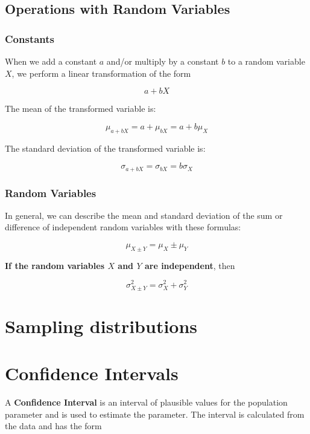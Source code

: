 \documentclass[
]{book}
\begin{document}
\hypertarget{operations-with-random-variables}{%
\section{Operations with Random Variables}\label{operations-with-random-variables}}

\hypertarget{constants}{%
\subsection{Constants}\label{constants}}

When we add a constant \(a\) and/or multiply by a constant \(b\) to a random
variable \(X\), we perform a linear transformation of the form

\[
a + bX
\]

The mean of the transformed variable is:

\[
\mu_{a+bX}=a+\mu_{bX}=a+b\mu_X
\]

The standard deviation of the transformed variable is:

\[
\sigma_{a+bX}=\sigma_{bX}=b\sigma_X
\]

\hypertarget{random-variables-1}{%
\subsection{Random Variables}\label{random-variables-1}}

In general, we can describe the mean and standard deviation of the sum
or difference of independent random variables with these formulas:

\[\mu_{X \pm Y} = \mu_X \pm \mu_Y\]

\textbf{If the random variables \(X\) and \(Y\) are independent}, then

\[ \sigma_{X \pm Y}^2 = \sigma_X^2 + \sigma_Y^2 \]

\hypertarget{sampling-distributions}{%
\chapter{Sampling distributions}\label{sampling-distributions}}

\hypertarget{confidence-intervals}{%
\chapter{Confidence Intervals}\label{confidence-intervals}}

A \textbf{Confidence Interval} is an interval of plausible values for the population parameter and is used to estimate the parameter. The interval is calculated from the data and has the form
\end{document}
